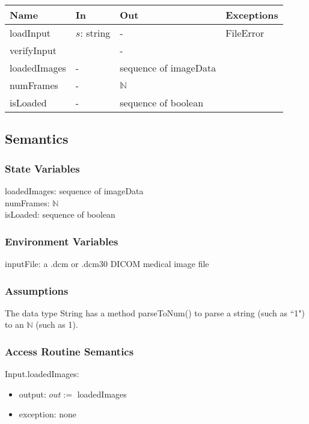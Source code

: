 \documentclass[12pt, titlepage]{article}
\begin{document}
\begin{center}
\begin{tabular}{p{3cm} p{2cm} p{5cm} p{2cm}}
\hline
\textbf{Name} & \textbf{In} & \textbf{Out} & \textbf{Exceptions} \\
\hline
loadInput & $s$: string & - & FileError\\
verifyInput & & - & \\
loadedImages & - & sequence of imageData\\
numFrames & - & $\mathbb{N}$ & \\
isLoaded & - & sequence of boolean\\
\hline
\end{tabular}
\end{center}

\subsection{Semantics}

\subsubsection{State Variables}

loadedImages: sequence of imageData\\
numFrames: $\mathbb{N}$\\
isLoaded: sequence of boolean

\subsubsection{Environment Variables}

inputFile: a .dcm or .dcm30 DICOM medical image file

\subsubsection{Assumptions}

The data type String has a method parseToNum() to parse a string (such as ``1")
to an $\mathbb{N}$ (such as 1).

\subsubsection{Access Routine Semantics}

\noindent Input.loadedImages:
\begin{itemize}
\item output: $out:=$ loadedImages 
\item exception: none 
\end{itemize}
\end{document}
